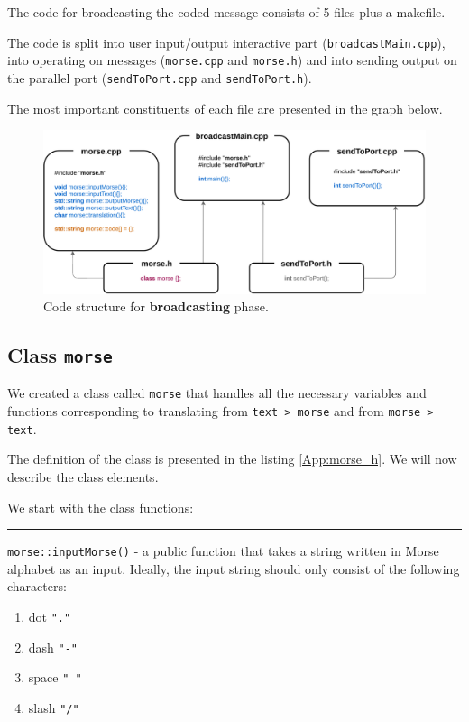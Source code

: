 \documentclass[12pt]{report}
\begin{document}
The code for broadcasting the coded message consists of 5 files plus a makefile. 

The code is split into user input/output interactive part (\verb|broadcastMain.cpp|), into operating on messages (\verb|morse.cpp| and \verb|morse.h|) and into sending output on the parallel port (\verb|sendToPort.cpp| and \verb|sendToPort.h|).

The most important constituents of each file are presented in the graph below.

\begin{figure}[H]
\centering\includegraphics[scale=0.12]{bCodeStructure}
\caption{Code structure for \textbf{broadcasting} phase.}				
\label{fig:br_code}
\end{figure}

\subsection{Class \texttt{morse}}

We created a class called \verb|morse| that handles all the necessary variables and functions corresponding to translating from \verb|text > morse| and from \verb|morse > text|.

The definition of the class is presented in the listing \ref{App:morse_h}. We will now describe the class elements.

We start with the class functions:

\rule{\textwidth}{0.5pt}

\verb|morse::inputMorse()| - a public function that takes a string written in Morse alphabet as an input. Ideally, the input string should only consist of the following characters:

\begin{enumerate}
\item dot \verb|"."|

\item dash \verb|"-"|

\item space \verb|" "|

\item slash \verb|"/"|
\end{enumerate}
\end{document}
